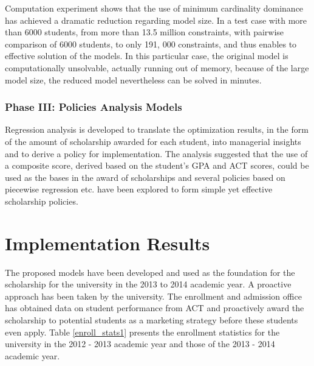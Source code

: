 \documentclass[12pt,english]{report}
\begin{document}
Computation experiment shows that the use of minimum cardinality dominance has
achieved a dramatic reduction regarding model size. In a test case with more
than 6000 students,  from more than 13.5 million constraints, with pairwise
comparison of 6000 students, to only 191, 000 constraints, and thus enables to
effective solution of the models.   In this particular case,  the original
model is computationally unsolvable, actually running out of memory, because of
the large model size,  the reduced model nevertheless can be solved in minutes.

\subsubsection{Phase III: Policies Analysis Models}
Regression analysis is developed to translate the optimization results, in the
form of the  amount of scholarship awarded for each student, into managerial
insights and to derive a policy for implementation.  The analysis suggested
that the use of a composite score, derived based on the student's GPA and ACT
scores, could be used as the bases in the award of scholarships and several
policies based on piecewise regression etc. have been explored to form simple
yet effective scholarship policies.



\section{Implementation Results}
The proposed models have been developed and used as the foundation for the
scholarship for the university in the 2013 to 2014 academic year.
A proactive approach has been taken by the university. The enrollment
and admission office has obtained data on student performance from 
ACT and proactively award the scholarship to potential students 
as a marketing strategy before these students even apply.
Table \ref{enroll_stats1} presents the enrollment statistics for the
university in the 2012 - 2013 academic year and those of the 2013 - 2014
academic year.
\end{document}
